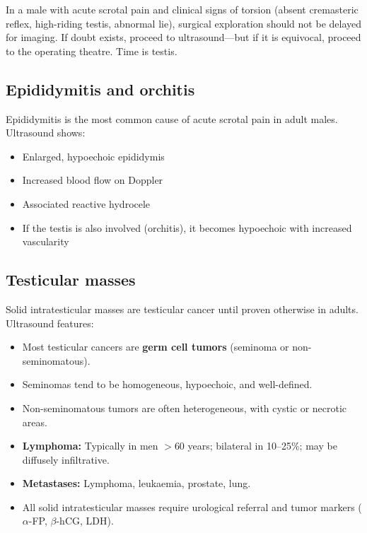 \begin{pearlbox}
In a male with acute scrotal pain and clinical signs of torsion (absent cremasteric reflex, high-riding testis, abnormal lie), surgical exploration should not be delayed for imaging. If doubt exists, proceed to ultrasound---but if it is equivocal, proceed to the operating theatre. Time is testis.
\end{pearlbox}

\subsection{Epididymitis and orchitis}
Epididymitis is the most common cause of acute scrotal pain in adult males. Ultrasound shows:
\begin{itemize}
    \item Enlarged, hypoechoic epididymis
    \item Increased blood flow on Doppler
    \item Associated reactive hydrocele
    \item If the testis is also involved (orchitis), it becomes hypoechoic with increased vascularity
\end{itemize}

\subsection{Testicular masses}
Solid intratesticular masses are testicular cancer until proven otherwise in adults. Ultrasound features:
\begin{itemize}
    \item Most testicular cancers are \textbf{germ cell tumors} (seminoma or non-seminomatous).
    \item Seminomas tend to be homogeneous, hypoechoic, and well-defined.
    \item Non-seminomatous tumors are often heterogeneous, with cystic or necrotic areas.
    \item \textbf{Lymphoma:} Typically in men $>$60 years; bilateral in 10--25\%; may be diffusely infiltrative.
    \item \textbf{Metastases:} Lymphoma, leukaemia, prostate, lung.
    \item All solid intratesticular masses require urological referral and tumor markers ($\alpha$-FP, $\beta$-hCG, LDH).
\end{itemize}

